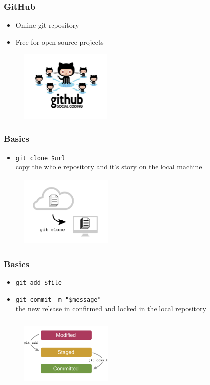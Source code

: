 \documentclass{beamer}
\begin{document}
\begin{frame}
\frametitle{GitHub}
\begin{itemize}
\item Online git repository
\item Free for open source projects
\end{itemize}
\begin{figure}
\centering
\includegraphics[height=3.5cm, width=4.5cm]{github_logo}
\end{figure}
\end{frame}

\begin{frame}[fragile]
\frametitle{Basics}
\begin{itemize}
\item \verb!git clone $url! \\ 
copy the whole repository and it's story on the local machine
\end{itemize}
\begin{figure}
\centering
\includegraphics[height=3.5cm, width=4.5cm]{clone}
\end{figure}
\end{frame}

\begin{frame}[fragile]
\frametitle{Basics}
\begin{itemize}
\item \verb!git add $file! 
\item \verb!git commit -m "$message"! \\ 
the new release in confirmed and locked in the local repository
\end{itemize}
\begin{figure}
\centering
\includegraphics[height=3.5cm, width=4.5cm]{commit}
\end{figure}
\end{frame}
\end{document}
